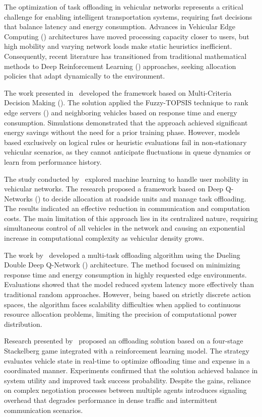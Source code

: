 The optimization of task offloading in vehicular networks represents a critical challenge for enabling intelligent transportation systems, requiring fast decisions that balance latency and energy consumption. Advances in Vehicular Edge Computing () architectures have moved processing capacity closer to users, but high mobility and varying network loads make static heuristics inefficient. Consequently, recent literature has transitioned from traditional mathematical methods to Deep Reinforcement Learning () approaches, seeking allocation policies that adapt dynamically to the environment.

The work presented in~\cite{vieira2025foff} developed the  framework based on Multi-Criteria Decision Making (). The solution applied the Fuzzy-TOPSIS technique to rank edge servers () and neighboring vehicles based on response time and energy consumption. Simulations demonstrated that the approach achieved significant energy savings without the need for a prior training phase. However, models based exclusively on logical rules or heuristic evaluations fail in non-stationary vehicular scenarios, as they cannot anticipate fluctuations in queue dynamics or learn from performance history.

The study conducted by~\cite{tan2018} explored machine learning to handle user mobility in vehicular networks. The research proposed a framework based on Deep Q-Networks () to decide allocation at roadside units and manage task offloading. The results indicated an effective reduction in communication and computation costs. The main limitation of this approach lies in its centralized nature, requiring simultaneous control of all vehicles in the network and causing an exponential increase in computational complexity as vehicular density grows.

The work by~\cite{pang2024} developed a multi-task offloading algorithm using the Dueling Double Deep Q-Network () architecture. The method focused on minimizing response time and energy consumption in highly requested edge environments. Evaluations showed that the model reduced system latency more effectively than traditional random approaches. However, being based on strictly discrete action spaces, the algorithm faces scalability difficulties when applied to continuous resource allocation problems, limiting the precision of computational power distribution.

Research presented by~\cite{fofana2024} proposed an offloading solution based on a four-stage Stackelberg game integrated with a reinforcement learning model. The strategy evaluates vehicle state in real-time to optimize offloading time and expense in a coordinated manner. Experiments confirmed that the solution achieved balance in system utility and improved task success probability. Despite the gains, reliance on complex negotiation processes between multiple agents introduces signaling overhead that degrades performance in dense traffic and intermittent communication scenarios.


